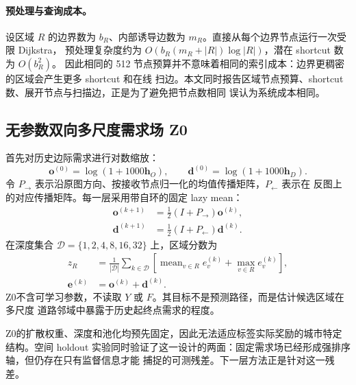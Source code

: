 \documentclass[UTF8,a4paper,10pt,twocolumn]{ctexart}
\newcommand{\zmethod}{Z0}
\begin{document}
\paragraph{预处理与查询成本。}
设区域 $R$ 的边界数为 $b_R$、内部诱导边数为 $m_R$。直接从每个边界节点运行一次受限 Dijkstra，
预处理复杂度约为 $O\!\left(b_R(m_R+|R|)\log |R|\right)$，潜在 shortcut 数为 $O(b_R^2)$。
因此相同的 512 节点预算并不意味着相同的索引成本：边界更稠密的区域会产生更多 shortcut 和在线
扫边。本文同时报告区域节点预算、shortcut 数、展开节点与扫描边，正是为了避免把节点数相同
误认为系统成本相同。

\subsection{无参数双向多尺度需求场 \zmethod}

首先对历史边际需求进行对数缩放：
\begin{equation}
  \bm{o}^{(0)}=\log(1+1000\bm{h}_O),\qquad
  \bm{d}^{(0)}=\log(1+1000\bm{h}_D).
\end{equation}
令 $P_{\rightarrow}$ 表示沿原图方向、按接收节点归一化的均值传播矩阵，$P_{\leftarrow}$ 表示在
反图上的对应传播矩阵。每一层采用带自环的固定 lazy mean：
\begin{equation}
  \begin{aligned}
  \bm{o}^{(k+1)}&=\tfrac{1}{2}(I+P_{\rightarrow})\bm{o}^{(k)},\\
  \bm{d}^{(k+1)}&=\tfrac{1}{2}(I+P_{\leftarrow})\bm{d}^{(k)}.
  \end{aligned}
  \label{eq:z0diffusion}
\end{equation}
在深度集合 $\mathcal{D}=\{1,2,4,8,16,32\}$ 上，区域分数为
\begin{equation}
  \begin{aligned}
  z_R&=\frac{1}{|\mathcal{D}|}\sum_{k\in\mathcal{D}}
  \left[\operatorname{mean}_{v\in R} e_v^{(k)}
  +\operatorname{max}_{v\in R} e_v^{(k)}\right],\\
  \bm{e}^{(k)}&=\bm{o}^{(k)}+\bm{d}^{(k)}.
  \end{aligned}
  \label{eq:z0score}
\end{equation}
\zmethod 不含可学习参数，不读取 $Y$ 或 $F$。其目标不是预测路径，而是估计候选区域在多尺度
道路邻域中暴露于历史起终点需求的程度。

\zmethod 的扩散权重、深度和池化均预先固定，因此无法适应标签实际奖励的城市特定结构。空间
holdout 实验同时验证了这一设计的两面：固定需求场已经形成强排序轴，但仍存在只有监督信息才能
捕捉的可测残差。下一层方法正是针对这一残差。
\end{document}
